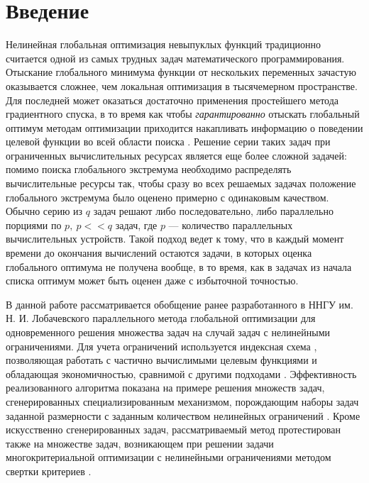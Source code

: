 \documentclass{cmi}
\begin{document}
\section*{Введение}
\label{sec-intro}
Нелинейная глобальная оптимизация невыпуклых функций традиционно считается одной из самых трудных
задач математического программирования. Отыскание глобального минимума функции от нескольких переменных
зачастую оказывается сложнее, чем локальная оптимизация в тысячемерном пространстве. Для последней может оказаться достаточно
применения простейшего метода градиентного спуска, в то время как чтобы \textit{гарантированно} отыскать глобальный оптимум методам
оптимизации приходится накапливать информацию о поведении целевой функции во всей области поиска \cite{Jones2009,Paulavicius2011,Evtushenko2013,Strongin2000}. Решение серии таких задач при ограниченных вычислительных
ресурсах является еще более сложной задачей: помимо поиска глобального экстремума необходимо
распределять вычислительные ресурсы так, чтобы сразу во всех решаемых задачах положение глобального
экстремума было оценено примерно с одинаковым качеством. Обычно серию из \(q\) задач решают либо последовательно, либо
параллельно порциями по \(p,\:p<<q\) задач, где \(p\) --- количество параллельных вычислительных устройств.
Такой подход ведет к тому, что в каждый момент времени до окончания вычислений
остаются задачи, в которых оценка глобального оптимума не получена вообще, в то время, как в задачах из начала
списка оптимум может быть оценен даже с избыточной точностью.

В данной работе рассматривается обобщение ранее разработанного в ННГУ им. Н. И. Лобачевского
параллельного метода глобальной оптимизации для одновременного решения множества задач \cite{BarkalovStrongin2018} на
случай задач с нелинейными ограничениями. Для учета ограничений используется индексная схема \cite{Strongin2000},
позволяющая работать с частично вычислимыми целевым функциями и обладающая экономичностью,
сравнимой с другими подходами \cite{BarkalovLebedev2017}. Эффективность реализованного
алгоритма показана на примере решения множеств задач, сгенерированных специализированным
механизмом, порождающим наборы задач заданной размерности с заданным количеством нелинейных ограничений \cite{GergelBarkalov2019}.
Кроме искусственно сгенерированных задач, рассматриваемый метод протестирован также
на множестве задач, возникающем при решении задачи многокритериальной оптимизации
с нелинейными ограничениями методом свертки критериев \cite{Ehrgott2005}.
\end{document}
